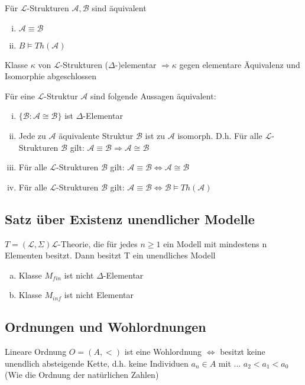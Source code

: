 \documentclass[12pt,a4paper]{article} %
\begin{document}
	Für $\mathcal{L}$-Strukturen $\mathcal{A}, \mathcal{B}$ sind äquivalent
	\begin{enumerate}[(i)]
		\item $\mathcal{A} \equiv \mathcal{B}$
		\item $B \vDash Th(\mathcal{A})$
	\end{enumerate}
	
	Klasse $\kappa$ von $\mathcal{L}$-Strukturen ($\Delta$-)elementar $\Rightarrow \kappa$ gegen elementare Äquivalenz und Isomorphie abgeschlossen 
	
	Für eine $\mathcal{L}$-Struktur $\mathcal{A}$ sind folgende Aussagen äquivalent:
	\begin{enumerate}[(i)]
		\item $\{\mathcal{B}: \mathcal{A} \cong \mathcal{B}\}$ ist $\Delta$-Elementar
		\item Jede zu $\mathcal{A}$ äquivalente Struktur $\mathcal{B}$ ist zu $\mathcal{A}$ isomorph. D.h. Für alle $\mathcal{L}$-Strukturen $\mathcal{B}$ gilt: $\mathcal{A} \equiv \mathcal{B} \Rightarrow \mathcal{A} \cong \mathcal{B}$
		\item Für alle $\mathcal{L}$-Strukturen $\mathcal{B}$ gilt: $\mathcal{A} \equiv \mathcal{B} \Leftrightarrow \mathcal{A} \cong \mathcal{B}$
		\item Für alle $\mathcal{L}$-Strukturen $\mathcal{B}$ gilt: $\mathcal{A} \equiv \mathcal{B} \Leftrightarrow \mathcal{B} \vDash Th(\mathcal{A})$
	\end{enumerate}

	
	
	\subsection{Satz über Existenz unendlicher Modelle}
	$T = (\mathcal{L}, \Sigma) \mathcal{L}$-Theorie, die für jedes $n \ge 1$ ein Modell mit mindestens n Elementen besitzt. Dann besitzt T ein unendliches Modell 
	
	\begin{enumerate}[(a)]
		\item Klasse $M_{fin}$ ist nicht $\Delta$-Elementar
		\item Klasse $M_{inf}$ ist nicht Elementar
	\end{enumerate} 

	\subsection{Ordnungen und Wohlordnungen}
	Lineare Ordnung $O = (A, <)$ ist eine Wohlordnung $\Leftrightarrow$ besitzt keine unendlich absteigende Kette, d.h. keine Individuen $a_n \in A$ mit ... $a_2 < a_1 < a_0$ (Wie die Ordnung der natürlichen Zahlen)
	
\end{document}
